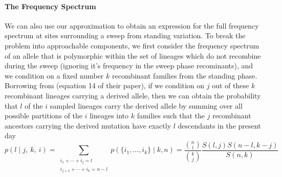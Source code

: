 \documentclass[a4paper,10pt]{article}
\begin{document}
\paragraph{The Frequency Spectrum} We can also use our approximation to obtain an expression for the full frequency spectrum at sites surrounding a sweep from standing variation. To break the problem into approachable components, we first consider the frequency spectrum of an allele that is polymorphic within the set of lineages which do not recombine during the sweep (ignoring it's frequency in the sweep phase recominants), and we condition on a fixed number $k$ recombinant families from the standing phase. Borrowing from \cite{Pennings2006} (equation 14 of their paper), if we condition on $j$ out of these $k$ recombinant lineages carrying a derived allele, then we can obtain the probability that $l$ of the $i$ sampled lineages carry the derived allele by summing over all possible partitions of the $i$ lineages into $k$ families such that the $j$ recombinant ancestors carrying the derived mutation have exactly $l$ descendants in the present day
\begin{equation}
p(l \mid j, ~k,~i) = \sum_{\substack{i_1+\cdots +i_j=l \\i_{j+1}+\cdots + i_k=n-l}} p(\{i_1,\dots,i_k\} \mid k, n) = \frac{ {n \choose l} }{ {k \choose j} }\frac{ S(l,j)  S(n-l,k-j)  }{ S(n,k) } \label{ESF_gives_freq_spec}
\end{equation}
\end{document}

